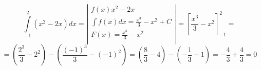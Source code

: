\documentclass[a4paper,12pt]{article}
\begin{document}
   
	$$
	\int\limits_{-1}^2 (x^2 - 2x)dx =  
	\left|
	\begin{array}{c}
	f(x) x^2 - 2x\\
	\int{f(x) dx} = \frac{x^3}{3} - x^2 +C\\
	F(x) = \frac{x^3}{3} - x^2 \\
	\end{array}
	\right |
	= 
	\left[
	\frac{x^3}{3}-x^2
	\right ]^{2}_{-1}
	=
	$$
	$$
	= \left(
	\frac{2^3}{3} - 2^2 
	\right )	
	-
	\left(
	\frac{({-1})^3}{3} - ({-1})^2 
	\right )	
	=
	\left(
	\frac{8}{3} - 4 
	\right )
	-
	\left(
	-\frac{1}{3} - 1 
	\right )
	=
	-\frac{4}{3}
	+\frac{4}{3} =0	
	$$
\end{document}

